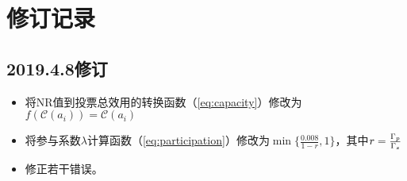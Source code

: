 \section{修订记录}
\subsection{2019.4.8修订}
\begin{itemize}
	\item  将NR值到投票总效用的转换函数（\ref{eq:capacity}）修改为$f(\mathcal{C}(a_i))=\mathcal{C}(a_i)$
	\item  将参与系数$\lambda$计算函数（\ref{eq:participation}）修改为$\min\{\frac{0.008}{1-r},1\}$，其中$r=\frac{\Gamma_p}{\Gamma_s}$
	\item 修正若干错误。
\end{itemize}